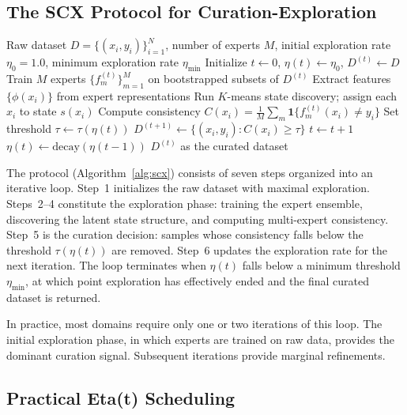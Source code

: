 \documentclass{article}
\begin{document}
\subsection{The SCX Protocol for Curation-Exploration}
\label{sec:protocol}

\begin{algorithm}[t]
\caption{SCX Curation-Exploration Protocol}
\label{alg:scx}
\begin{algorithmic}[1]
\Require Raw dataset $D = \{(x_i, y_i)\}_{i=1}^N$, number of experts $M$, initial exploration rate $\eta_0 = 1.0$, minimum exploration rate $\eta_{\min}$
\State Initialize $t \gets 0$, $\eta(t) \gets \eta_0$, $D^{(t)} \gets D$
\Repeat
    \State Train $M$ experts $\{f_m^{(t)}\}_{m=1}^M$ on bootstrapped subsets of $D^{(t)}$ 
    \State Extract features $\{\phi(x_i)\}$ from expert representations
    \State Run $K$-means state discovery; assign each $x_i$ to state $s(x_i)$ 
    \State Compute consistency $C(x_i) = \frac{1}{M}\sum_m \mathbf{1}\{f_m^{(t)}(x_i) \neq y_i\}$ 
    \State Set threshold $\tau \gets \tau(\eta(t))$
    \State $D^{(t+1)} \gets \{(x_i, y_i) : C(x_i) \geq \tau\}$ 
    \State $t \gets t + 1$
    \State $\eta(t) \gets \text{decay}(\eta(t-1))$
\State \Return $D^{(t)}$ as the curated dataset
\end{algorithmic}
\end{algorithm}

The protocol (Algorithm~\ref{alg:scx}) consists of seven steps organized into an iterative loop. Step~1 initializes the raw dataset with maximal exploration. Steps~2--4 constitute the exploration phase: training the expert ensemble, discovering the latent state structure, and computing multi-expert consistency. Step~5 is the curation decision: samples whose consistency falls below the threshold $\tau(\eta(t))$ are removed. Step~6 updates the exploration rate for the next iteration. The loop terminates when $\eta(t)$ falls below a minimum threshold $\eta_{\min}$, at which point exploration has effectively ended and the final curated dataset is returned.

In practice, most domains require only one or two iterations of this loop. The initial exploration phase, in which experts are trained on raw data, provides the dominant curation signal. Subsequent iterations provide marginal refinements.

\subsection{Practical Eta(t) Scheduling}
\label{sec:etascheduling}
\end{document}
